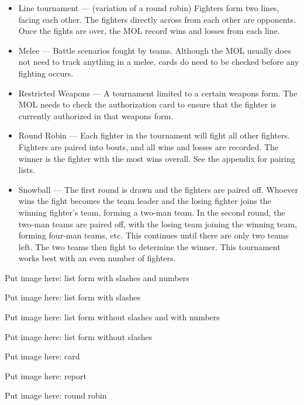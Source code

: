 \documentclass{article}
\begin{document}
\begin{itemize}
\item Line tournament --- (variation of a round robin) Fighters form two lines, facing each other. The
fighters directly across from each other are opponents. Once the fights are over, the MOL record wins
and losses from each line.

\item Melee --- Battle scenarios fought by teams. Although the MOL usually does not need to track anything
in a melee, cards do need to be checked before any fighting occurs.

\item Restricted Weapons --- A tournament limited to a certain weapons form. The MOL needs to check the
authorization card to ensure that the fighter is currently authorized in that weapons form.

\item Round Robin --- Each fighter in the tournament will fight all other fighters. Fighters are paired into
bouts, and all wins and losses are recorded. The winner is the fighter with the most wins overall. See
the appendix for pairing lists.

\item Snowball --- The first round is drawn and the fighters are paired off. Whoever wins the fight becomes
the team leader and the losing fighter joins the winning fighter’s team, forming a two-man team. In the
second round, the two-man teams are paired off, with the losing team joining the winning team,
forming four-man teams, etc. This continues until there are only two teams left. The two teams then
fight to determine the winner. This tournament works best with an even number of fighters.
\end{itemize}

Put image here: list form with slashes and numbers

Put image here: list form with slashes


Put image here: list form without slashes and with numbers

Put image here: list form without slashes

Put image here: card

Put image here: report

Put image here: round robin
\end{document}
